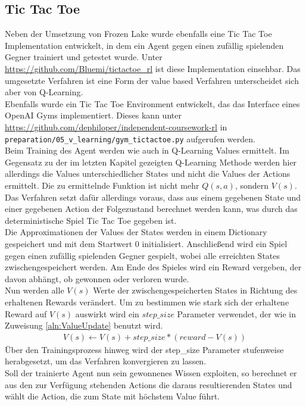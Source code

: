 \documentclass[11pt]{scrartcl}
\begin{document}
\subsection{Tic Tac Toe}
Neben der Umsetzung von Frozen Lake wurde ebenfalls eine Tic Tac Toe Implementation
entwickelt, in dem ein Agent gegen einen zufällig spielenden Gegner trainiert und getestet
wurde. Unter \url{https://github.com/Bluemi/tictactoe_rl} ist diese Implementation
einsehbar. Das umgesetzte Verfahren ist eine Form der value based Verfahren unterscheidet
sich aber von Q-Learning.\\
Ebenfalls wurde ein Tic Tac Toe Environment entwickelt, das das Interface eines OpenAI
Gyms implementiert. Dieses kann unter
\url{https://github.com/dephiloper/independent-coursework-rl} in
\lstinline!preparation/05_v_learning/gym_tictactoe.py! aufgerufen werden.\\
Beim Training des Agent werden wie auch in Q-Learning Values ermittelt. Im Gegensatz zu
der im letzten Kapitel gezeigten Q-Learning Methode werden hier allerdings die Values
unterschiedlicher States und nicht die Values der Actions ermittelt. Die zu ermittelnde
Funktion ist nicht mehr $Q(s, a)$, sondern $V(s)$. Das Verfahren setzt dafür allerdings
voraus, dass aus einem gegebenen State und einer gegebenen Action der Folgezustand
berechnet werden kann, was durch das deterministische Spiel Tic Tac Toe gegeben ist.\\
Die Approximationen der Values der States werden in einem Dictionary gespeichert und mit
dem Startwert 0 initialisiert. Anschließend wird ein Spiel gegen einen zufällig spielenden
Gegner gespielt, wobei alle erreichten States zwischengespeichert werden. Am Ende des
Spieles wird ein Reward vergeben, der davon abhängt, ob gewonnen oder verloren wurde.\\
Nun werden alle $V(s)$ Werte der zwischengespeicherten States in Richtung des erhaltenen
Rewards verändert. Um zu bestimmen wie stark sich der erhaltene Reward auf $V(s)$ auswirkt
wird ein $step\_size$ Parameter verwendet, der wie in Zuweisung \ref{aln:ValueUpdate}
benutzt wird.
\begin{align}
  V(s) \leftarrow V(s) + step\_size * (reward - V(s))
  \label{aln:ValueUpdate}
\end{align}
\noindent
Über den Trainingsprozess hinweg wird der step\_size Parameter stufenweise herabgesetzt,
um das Verfahren konvergieren zu lassen.\\
Soll der trainierte Agent nun sein gewonnenes Wissen exploiten, so berechnet er aus den
zur Verfügung stehenden Actions die daraus resultierenden States und wählt die Action, die
zum State mit höchstem Value führt.
\end{document}

